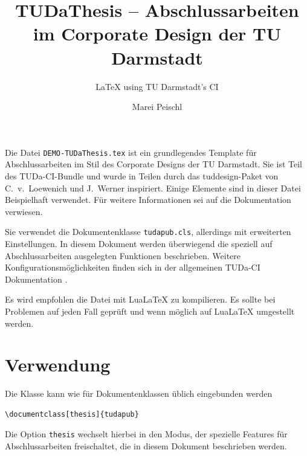 \documentclass[
	ngerman,%
	accentcolor=9c,%
	ruledheaders=section,%
	class=report,%
	thesis={type=bachelor},%
	fontsize=11pt,%
	parskip=half-,%
	custommargins=true,%
	marginpar=false,%
]{tudapub}
\title{TUDaThesis -- Abschlussarbeiten im Corporate Design der TU Darmstadt}
\subtitle{\LaTeX{} using TU Darmstadt's CI}
\author{Marei Peischl}
\institute{Institut}
\newcommand*{\file}[1]{\texttt{#1}}
\newcommand*{\code}[1]{\texttt{#1}}
\begin{document}
\maketitle


\tableofcontents



Die Datei \file{DEMO-TUDaThesis.tex} ist ein grundlegendes Template für Abschlussarbeiten im Stil des Corporate Designs der TU Darmstadt.
Sie ist Teil des TUDa-CI-Bundle und wurde in Teilen durch das tuddesign-Paket von C.~v.~Loewenich und J.~Werner inspiriert.
Einige Elemente sind in dieser Datei Beispielhaft verwendet. Für weitere Informationen sei auf die Dokumentation \cite{tuda-ci} verwiesen.

Sie verwendet die Dokumentenklasse \file{tudapub.cls}, allerdings mit erweiterten Einstellungen.
In diesem Dokument werden überwiegend die speziell auf Abschlussarbeiten ausgelegten Funktionen beschrieben.
Weitere Konfigurationsmöglichkeiten finden sich in der allgemeinen TUDa-CI Dokumentation \cite{tuda-ci}.

Es wird empfohlen die Datei mit Lua\LaTeX{} zu kompilieren. Es sollte bei Problemen auf jeden Fall geprüft und wenn möglich auf Lua\LaTeX{} umgestellt werden.

\chapter{Verwendung}
Die Klasse kann wie für Dokumentenklassen üblich eingebunden werden
\begin{verbatim}
\documentclass[thesis]{tudapub}
\end{verbatim}
Die Option \code{thesis} wechselt hierbei in den Modus, der spezielle Features für Abschlussarbeiten freischaltet, die in diesem Dokument beschrieben werden.
\end{document}
